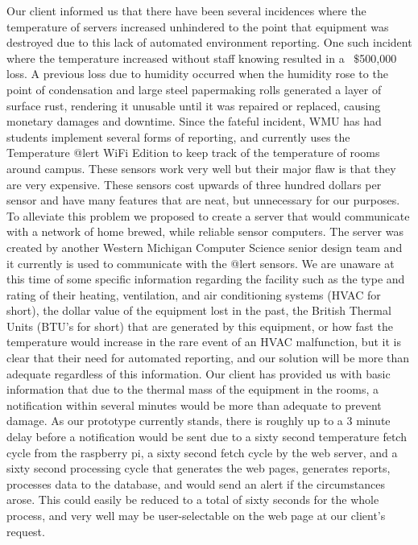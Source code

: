 \documentclass{report}
\begin{document}
 Our client informed us that there have been several incidences where the temperature of servers increased unhindered to the point that equipment was destroyed due to this lack of automated environment reporting. One such incident where the temperature increased without staff knowing resulted in a ~$\$$500,000 loss. A previous loss due to humidity occurred when the humidity rose to the point of condensation and large steel papermaking rolls generated a layer of surface rust, rendering it unusable until it was repaired or replaced, causing monetary damages and downtime. 
Since the fateful incident, WMU has had students implement several forms of reporting, and currently uses the Temperature @lert WiFi Edition to keep track of the temperature of rooms around campus. 
These sensors work very well but their major flaw is that they are very expensive. These sensors cost upwards of three hundred dollars per sensor and have many features that are neat, but unnecessary for our purposes. 
To alleviate this problem we proposed to create a server that would communicate with a network of home brewed, while reliable sensor computers. 
The server was created by another Western Michigan Computer Science senior design team and it currently is used to communicate with the @lert sensors.
\newline
\indent  
We are unaware at this time of some specific information regarding the facility such as the type and rating of their heating, ventilation, and air conditioning systems (HVAC for short), the dollar value of the equipment lost in the past, the British Thermal Units (BTU’s for short) that are generated by this equipment, or how fast the temperature would increase in the rare event of an HVAC malfunction, but it is clear that their need for automated reporting, and our solution will be more than adequate regardless of this information. Our client has provided us with basic information that due to the thermal mass of the equipment in the rooms, a notification within several minutes would be more than adequate to prevent damage. As our prototype currently stands, there is roughly up to a 3 minute delay before a notification would be sent due to a sixty second temperature fetch cycle from the raspberry pi, a sixty second fetch cycle by the web server, and a sixty second processing cycle that generates the web pages, generates reports, processes data to the database, and would send an alert if the circumstances arose. This could easily be reduced to a total of sixty seconds for the whole process, and very well may be user-selectable on the web page at our client's request. 
\end{document}
